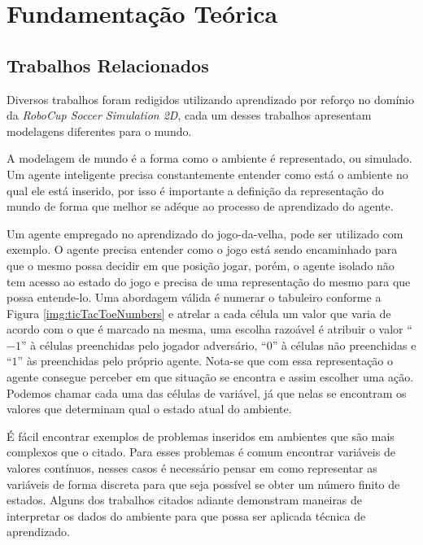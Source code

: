 \chapter{Fundamentação Teórica}\label{sec:fundamentation}

\section{Trabalhos Relacionados}\label{trabalhosRelacionados}

Diversos trabalhos foram redigidos utilizando aprendizado por reforço no domínio da \textit{RoboCup
Soccer Simulation 2D}, cada um desses trabalhos apresentam modelagens diferentes para o mundo.

A modelagem de mundo é a forma como o ambiente é representado, ou simulado. Um agente inteligente
precisa constantemente entender como está o ambiente no qual ele está inserido, por isso é
importante a definição da representação do mundo de forma que melhor se adéque ao processo de
aprendizado do agente.

Um agente empregado no aprendizado do jogo-da-velha, pode ser utilizado com exemplo. O agente
precisa entender como o jogo está sendo encaminhado para que o mesmo possa decidir em que posição
jogar, porém, o agente isolado não tem acesso ao estado do jogo e precisa de uma representação do
mesmo para que possa entende-lo. Uma abordagem válida é numerar o tabuleiro conforme a Figura
\ref{img:ticTacToeNumbers} e atrelar a cada célula um valor que varia de acordo com o que é marcado
na mesma, uma escolha razoável é atribuir o valor ``$-1$'' à células preenchidas pelo jogador
adversário, ``$0$'' à células não preenchidas e ``$1$'' às preenchidas pelo próprio agente. Nota-se que com
essa representação o agente consegue perceber em que situação se encontra e assim escolher uma ação.
Podemos chamar cada uma das células de variável, já que nelas se encontram os valores que determinam
qual o estado atual do ambiente.


É fácil encontrar exemplos de problemas inseridos em ambientes que são mais complexos que o citado.
Para esses problemas é comum encontrar variáveis de valores contínuos, nesses casos é necessário
pensar em como representar as variáveis de forma discreta para que seja possível se obter um número
finito de estados. Alguns dos trabalhos citados adiante demonstram maneiras de interpretar os dados
do ambiente para que possa ser aplicada técnica de aprendizado. 


